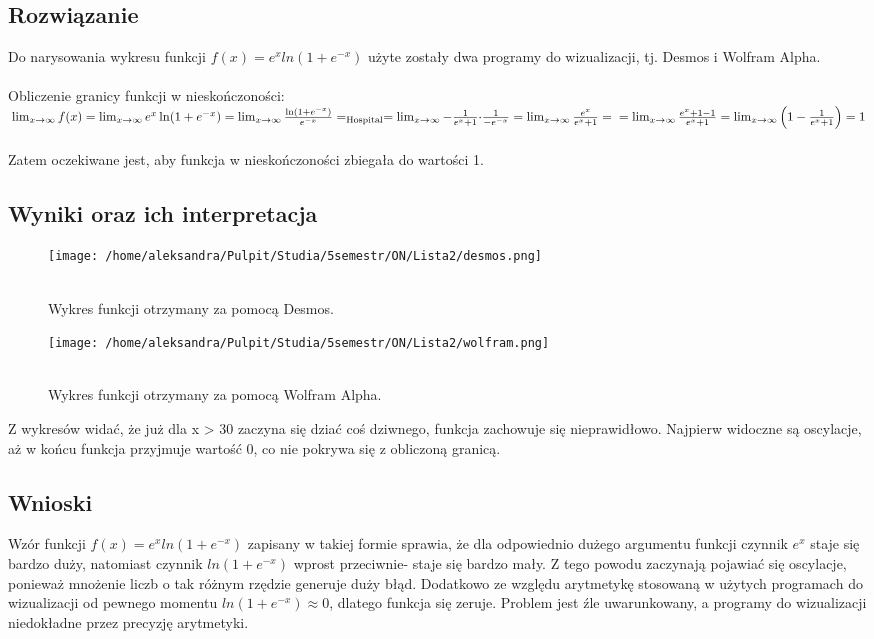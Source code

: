 \documentclass{article}
\begin{document}
\subsection{Rozwiązanie}
Do narysowania wykresu funkcji $f(x) = e^xln(1 + e^{-x})$ użyte zostały dwa programy do wizualizacji, tj. Desmos i Wolfram Alpha. 
\\ \\Obliczenie granicy funkcji w nieskończoności:
\\
$
\\
\lim_{x \to \infty} f(x) = \lim_{x \to \infty} e^x \ln(1 + e^{-x}) 
= \lim_{x \to \infty} \frac{\ln(1 + e^{-x})}{e^{-x}} 
=_{\text{Hospital}} = \lim_{x \to \infty} {-\frac{1}{e^x + 1} \cdot} \frac {1}{-e^{-x}} 
= \lim_{x \to \infty} \frac{e^x}{e^x + 1} =
\\
= \lim_{x \to \infty} \frac{e^x + 1 - 1}{e^x + 1} 
= \lim_{x \to \infty} \left(1 - \frac{1}{e^x + 1}\right) = 1
$
\\ \\
Zatem oczekiwane jest, aby funkcja w nieskończoności zbiegała do wartości 1.
\subsection{Wyniki oraz ich interpretacja}
\begin{figure}[H]
    \centering
    \begin{minipage}{0.43\textwidth}
        \centering
        \texttt{[image: /home/aleksandra/Pulpit/Studia/5semestr/ON/Lista2/desmos.png]}
        \caption{\\Wykres funkcji otrzymany za pomocą Desmos.}
    \end{minipage}
    \hfill
    \begin{minipage}{0.48\textwidth}
        \centering
        \texttt{[image: /home/aleksandra/Pulpit/Studia/5semestr/ON/Lista2/wolfram.png]}
        \caption{\\Wykres funkcji otrzymany za pomocą Wolfram Alpha.}
    \end{minipage}
\end{figure}

Z wykresów widać, że już dla x > 30 zaczyna się dziać coś dziwnego, funkcja zachowuje się nieprawidłowo. Najpierw widoczne są oscylacje, aż w końcu funkcja przyjmuje wartość 0, co nie pokrywa się z obliczoną granicą.
\subsection{Wnioski}
Wzór funkcji $f(x) = e^xln(1 + e^{-x})$ zapisany w takiej formie sprawia, że dla odpowiednio dużego argumentu funkcji czynnik $e^x$ staje się bardzo duży, natomiast czynnik $ln(1 + e^{-x})$ wprost przeciwnie- staje się bardzo mały. Z tego powodu zaczynają pojawiać się oscylacje, ponieważ mnożenie liczb o tak różnym rzędzie generuje duży błąd. Dodatkowo ze względu arytmetykę stosowaną w użytych programach do wizualizacji od pewnego momentu $ln(1 + e^{-x}) \approx 0$, dlatego funkcja się zeruje. Problem jest źle uwarunkowany, a programy do wizualizacji niedokładne przez precyzję arytmetyki.
\end{document}
